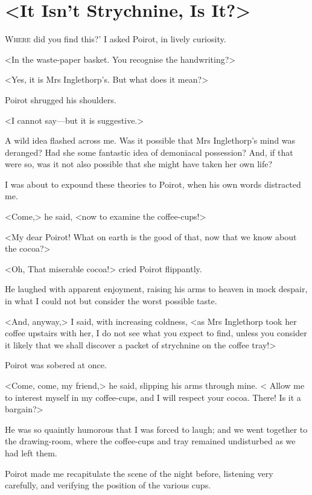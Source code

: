 \chapter{<It Isn't Strychnine, Is It?>}
	
\lettrine[ante=`]{W}{here} did you find this?' I asked Poirot, in lively curiosity. 

\zz
 <In the waste-paper basket. You recognise the handwriting?> 

\zz
 <Yes, it is Mrs Inglethorp's. But what does it mean?> 

\zz
 Poirot shrugged his shoulders. 

 <I cannot say—but it is suggestive.> 

 A wild idea flashed across me. Was it possible that Mrs Inglethorp's mind was deranged? Had she some fantastic idea of demoniacal possession? And, if that were so, was it not also possible that she might have taken her own life? 

 I was about to expound these theories to Poirot, when his own words distracted me. 

 <Come,> he said, <now to examine the coffee-cups!> 

 <My dear Poirot! What on earth is the good of that, now that we know about the cocoa?> 

 <Oh,  That miserable cocoa!> cried Poirot flippantly. 

 He laughed with apparent enjoyment, raising his arms to heaven in mock despair, in what I could not but consider the worst possible taste. 

 <And, anyway,> I said, with increasing coldness, <as Mrs Inglethorp took her coffee upstairs with her, I do not see what you expect to find, unless you consider it likely that we shall discover a packet of strychnine on the coffee tray!> 

 Poirot was sobered at once. 

 <Come, come, my friend,> he said, slipping his arms through mine. < Allow me to interest myself in my coffee-cups, and I will respect your cocoa. There! Is it a bargain?> 

 He was so quaintly humorous that I was forced to laugh; and we went together to the drawing-room, where the coffee-cups and tray remained undisturbed as we had left them. 

 Poirot made me recapitulate the scene of the night before, listening very carefully, and verifying the position of the various cups. 

